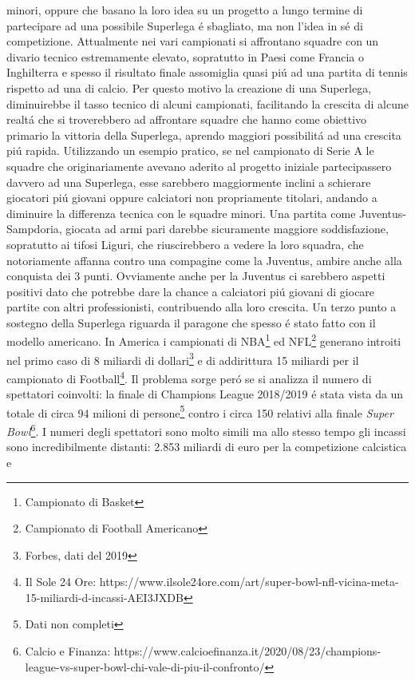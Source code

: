 \documentclass[
    corpo=12pt,
    oneside,
    evenboxes,
    tipotesi=triennale,
    stile=classica,
    oldstyle,
    autoretitolo,
    greek,
]{toptesi}
\begin{document}
\begin{interlinea}{1.5}
minori, oppure che basano la loro idea su un progetto a lungo termine di partecipare ad una possibile Superlega \'e sbagliato, 
ma non l'idea in s\'e di competizione. Attualmente nei vari campionati si affrontano squadre con un divario tecnico estremamente elevato, 
sopratutto in Paesi come Francia o Inghilterra e spesso il risultato finale assomiglia quasi pi\'u ad una partita di tennis rispetto ad una
di calcio. Per questo motivo la creazione di una Superlega, diminuirebbe il tasso tecnico di alcuni campionati, facilitando la crescita di alcune realt\'a 
che si troverebbero ad affrontare squadre che hanno come obiettivo primario la vittoria della Superlega,
aprendo maggiori possibilit\'a ad una crescita pi\'u rapida. Utilizzando un esempio pratico, se nel campionato di Serie A le squadre che originariamente avevano
aderito al progetto iniziale partecipassero davvero ad una Superlega, esse sarebbero maggiormente inclini a schierare giocatori pi\'u giovani oppure
calciatori non propriamente titolari, andando a diminuire la differenza tecnica con le squadre minori. Una partita come Juventus-Sampdoria, giocata
ad armi pari darebbe sicuramente maggiore soddisfazione, sopratutto ai tifosi Liguri, che riuscirebbero a vedere la loro squadra, che notoriamente
affanna contro una compagine come la Juventus, ambire anche alla conquista dei 3 punti. Ovviamente anche per la Juventus ci sarebbero
aspetti positivi dato che potrebbe dare la chance a calciatori pi\'u giovani di giocare partite con altri professionisti, contribuendo alla loro 
crescita.
Un terzo punto a sostegno della Superlega riguarda il paragone che spesso \'e stato fatto con il modello americano. In America i campionati di NBA\footnote{Campionato di Basket}
ed NFL\footnote{Campionato di Football Americano} generano introiti nel primo caso di 8 miliardi di dollari\footnote{Forbes, dati del 2019} e di addirittura
15 miliardi per il campionato di Football\footnote{Il Sole 24 Ore: https://www.ilsole24ore.com/art/super-bowl-nfl-vicina-meta-15-miliardi-d-incassi-AEI3JXDB}.
Il problema sorge per\'o se si analizza il numero di spettatori coinvolti: la finale di Champions League 2018/2019 \'e stata vista da un totale di 
circa 94 milioni di persone\footnote{Dati non completi} contro i circa 150 relativi alla finale \emph{Super Bowl}\footnote{Calcio e Finanza: https://www.calcioefinanza.it/2020/08/23/champions-league-vs-super-bowl-chi-vale-di-piu-il-confronto/}. 
I numeri degli spettatori sono molto simili ma allo stesso tempo gli incassi sono incredibilmente distanti: 2.853 miliardi di euro per la competizione calcistica e 

\end{interlinea}
\end{document}
